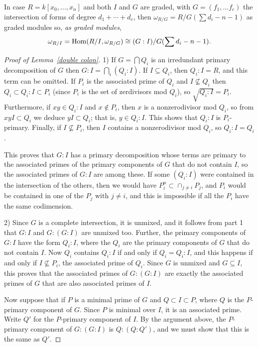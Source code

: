 In case $R = k[x_{0},\dots,x_{n}]$ and both $I$ and $G$ are graded, with $G = (f_{1}, \dots f_{c})$ the intersection of forms of degree
$d_{1}+\cdots + d_{c}$, then $\omega_{R/G} = R/G(\sum d_{i} -n-1)$ as graded modules so, \emph{as graded modules},
$$
\omega_{R/I} = \operatorname{Hom}(R/I, \omega_{R/G})\cong (G:I)/G(\sum d_{i} -n-1).
$$


\begin{proof}[Proof of Lemma~\ref{double colon}]
 1) If $G = \bigcap Q_{i}$ is an irredundant primary decomposition of $G$ then
$G:I = \bigcap_i (Q_{i}:I)$. If $I \subseteq Q_i$, then $Q_{i}:I = R$, and this term can be omitted. If $P_i$ is the associated prime of $Q_i$
and $I \not\subseteq Q_i$ then $ Q_i \subset Q_i:I\subset P_i$ (since $P_i$ is the set of zerdivisors mod $Q_i$), 
so $\sqrt {Q_i:I} = P_i$. Furthermore, if $xy\in Q_i:I$ and $x\notin P_i$, then $x$ is a nonzerodivisor mod $Q_i$, so from
$xyI\subset Q_i$ we deduce $yI\subset Q_i$; that is, $y\in Q_i:I$. This shows that $Q_i:I$ is $P_i$-primary. 
Finally, if $I\not\subseteq P_i$, then $I$ contains a nonzerodivisor mod $Q_i$, so $Q_i:I = Q_i$.

This proves that $G:I$ has a primary decomposition whose terms are primary to the associated primes of the primary
components of $G$ that do not contain $I$, so the associated primes of $G:I$ are among these. If some $(Q_i:I)$ were contained
in the intersection of the others, then we would have $P_i^n \subset \cap_{j\neq i}P_j$, and $P_i$ would be contained in one
of the $P_j$ with $j\neq i$, and this is impossible if all the $P_i$ have the same codimension.
 
 2) Since $G$ is a complete intersection, it is unmixed, and it follows from part 1 that $G:I$ and $G:(G:I)$ are unmixed too. Further,
 the primary components of $G:I$ have the form $Q_i:I$, where the $Q_i$ are the primary components of $G$ that
 do not contain $I$. Now $Q_i$ contains $Q_i:I$ if and only if $Q_i=Q_i:I$, and this happens if and only if
  $I\not\subseteq P_i$,  the associated prime of $Q_i$. Since $G$ is unmixed and $G\subseteq I$, this proves that the associated primes of 
  $G:(G:I)$ are exactly the associated primes of $G$ that are also associated primes of $I$.
  
 Now suppose that if $P$ is a minimal prime of $G$ and $Q \subset I \subset P$, where $Q$ is the $P$-primary
  component of $G$. Since $P$ is minimal over $I$, it is an associated prime. Write $Q'$ for the $P$-primary component
  of $I$. By the argument above, the $P$-primary component of $G:(G:I)$ is $Q:(Q:Q')$, and we must show that this is the
  same as $Q'$.
  

\end{proof}
